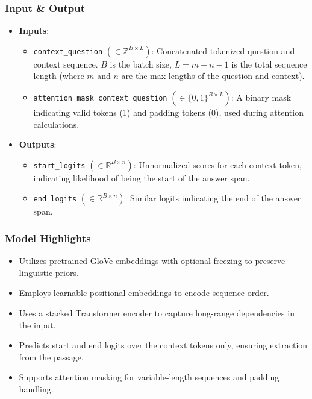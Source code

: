 \documentclass[runningheads]{llncs}
\begin{document}
\subsubsection{Input \& Output}
\begin{itemize}
    \item \textbf{Inputs}:
    \begin{itemize}
        \item \texttt{context\_question} $(\in \mathbb{Z}^{B \times L})$: Concatenated tokenized question and context sequence. $B$ is the batch size, $L = m + n - 1$ is the total sequence length (where $m$ and $n$ are the max lengths of the question and context).
        \item \texttt{attention\_mask\_context\_question} $(\in \{0,1\}^{B \times L})$: A binary mask indicating valid tokens (1) and padding tokens (0), used during attention calculations.
    \end{itemize}
    \item \textbf{Outputs}:
    \begin{itemize}
        \item \texttt{start\_logits} $(\in \mathbb{R}^{B \times n})$: Unnormalized scores for each context token, indicating likelihood of being the start of the answer span.
        \item \texttt{end\_logits} $(\in \mathbb{R}^{B \times n})$: Similar logits indicating the end of the answer span.
    \end{itemize}
\end{itemize}

\subsubsection{Model Highlights}
\begin{itemize}
    \item Utilizes pretrained GloVe embeddings with optional freezing to preserve linguistic priors.
    \item Employs learnable positional embeddings to encode sequence order.
    \item Uses a stacked Transformer encoder to capture long-range dependencies in the input.
    \item Predicts start and end logits over the context tokens only, ensuring extraction from the passage.
    \item Supports attention masking for variable-length sequences and padding handling.
\end{itemize}
\end{document}
